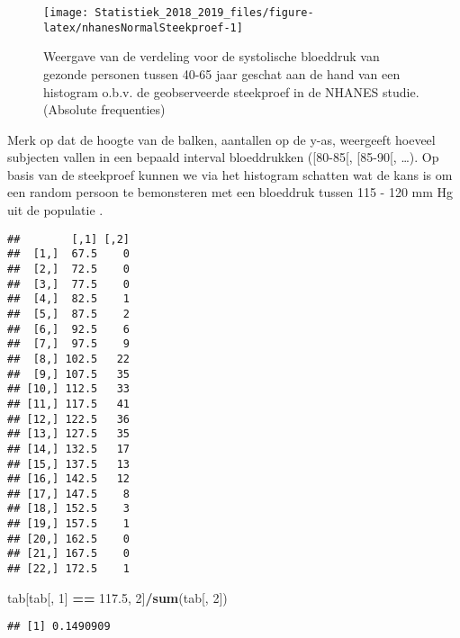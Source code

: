 \documentclass[12pt,dutch,coursenotes]{book}
\newenvironment{Shaded}{\begin{snugshade}}{\end{snugshade}}
\newcommand{\KeywordTok}[1]{\textcolor[rgb]{0.13,0.29,0.53}{\textbf{#1}}}
\newcommand{\DecValTok}[1]{\textcolor[rgb]{0.00,0.00,0.81}{#1}}
\newcommand{\FloatTok}[1]{\textcolor[rgb]{0.00,0.00,0.81}{#1}}
\newcommand{\StringTok}[1]{\textcolor[rgb]{0.31,0.60,0.02}{#1}}
\newcommand{\OperatorTok}[1]{\textcolor[rgb]{0.81,0.36,0.00}{\textbf{#1}}}
\newcommand{\NormalTok}[1]{#1}
\theoremstyle{definition}
\theoremstyle{definition}
\theoremstyle{definition}
\theoremstyle{remark}
\begin{document}
\begin{figure}

{\centering \texttt{[image: Statistiek\_2018\_2019\_files/figure-latex/nhanesNormalSteekproef-1]} 

}

\caption{Weergave van de verdeling voor de systolische bloeddruk van gezonde personen tussen 40-65 jaar geschat aan de hand van een histogram o.b.v. de geobserveerde steekproef in de NHANES studie. (Absolute frequenties)}\label{fig:nhanesNormalSteekproef}
\end{figure}

Merk op dat de hoogte van de balken, aantallen op de y-as, weergeeft
hoeveel subjecten vallen in een bepaald interval bloeddrukken
({[}80-85{[}, {[}85-90{[}, \ldots{}). Op basis van de steekproef kunnen
we via het histogram schatten wat de kans is om een random persoon te
bemonsteren met een bloeddruk tussen 115 - 120 mm Hg uit de populatie .

\begin{Shaded}
\end{Shaded}

\begin{verbatim}
##        [,1] [,2]
##  [1,]  67.5    0
##  [2,]  72.5    0
##  [3,]  77.5    0
##  [4,]  82.5    1
##  [5,]  87.5    2
##  [6,]  92.5    6
##  [7,]  97.5    9
##  [8,] 102.5   22
##  [9,] 107.5   35
## [10,] 112.5   33
## [11,] 117.5   41
## [12,] 122.5   36
## [13,] 127.5   35
## [14,] 132.5   17
## [15,] 137.5   13
## [16,] 142.5   12
## [17,] 147.5    8
## [18,] 152.5    3
## [19,] 157.5    1
## [20,] 162.5    0
## [21,] 167.5    0
## [22,] 172.5    1
\end{verbatim}

\begin{Shaded}
\begin{Highlighting}[]
\NormalTok{tab[tab[, }\DecValTok{1}\NormalTok{] }\OperatorTok{==}\StringTok{ }\FloatTok{117.5}\NormalTok{, }\DecValTok{2}\NormalTok{]}\OperatorTok{/}\KeywordTok{sum}\NormalTok{(tab[, }\DecValTok{2}\NormalTok{])}
\end{Highlighting}
\end{Shaded}

\begin{verbatim}
## [1] 0.1490909
\end{verbatim}
\end{document}

